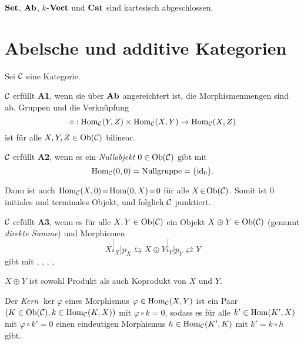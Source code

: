 \documentclass{cheat-sheet}
\begin{document}
\begin{bspe}
  $\mathbf{Set}$, $\mathbf{Ab}$, $k$-$\mathbf{Vect}$ und $\mathbf{Cat}$ sind kartesisch abgeschlossen.
\end{bspe}


\section{Abelsche und additive Kategorien}

Sei $\mathcal{C}$ eine Kategorie.

\begin{axiom}
  $\mathcal{C}$ erfüllt \textbf{A1}, wenn sie über $\mathbf{Ab}$ angereichtert ist, \dh{} die Morphismenmengen sind ab. Gruppen und die Verknüpfung
  \[ \circ : \operatorname{Hom}_{\mathcal{C}}(Y, Z) \times \operatorname{Hom}_{\mathcal{C}}(X, Y) \to \operatorname{Hom}_{\mathcal{C}}(X, Z) \]
  ist für alle $X, Y, Z \in \operatorname{Ob}(\mathcal{C})$ bilinear.
\end{axiom}

\begin{axiom}
  $\mathcal{C}$ erfüllt \textbf{A2}, wenn es ein \emph{Nullobjekt} $0 \in \operatorname{Ob}(\mathcal{C})$ gibt mit
  \[ \operatorname{Hom}_{\mathcal{C}}(0, 0) = \text{Nullgruppe} = \{ \operatorname{id}_0 \}. \]
\end{axiom}

\begin{bem}
  Dann ist auch $\operatorname{Hom}_{\mathcal{C}}(X, 0) \!=\! \operatorname{Hom}(0, X) \!=\! 0$ für alle $X \!\in\! \operatorname{Ob}(\mathcal{C})$.
  Somit ist $0$ initiales und terminales Objekt, und folglich $\mathcal{C}$ punktiert.
\end{bem}

\begin{axiom}
  $\mathcal{C}$ erfüllt \textbf{A3}, wenn es für alle $X, Y \in \operatorname{Ob}(\mathcal{C})$ ein Objekt $X \oplus Y \in \operatorname{Ob}(\mathcal{C})$ (genannt \emph{direkte Summe}) und Morphismen
  \[ X \stackrel[i_X]{p_X}{\leftrightarrows} X \oplus Y \stackrel[i_Y]{p_Y}{\rightleftarrows} Y \]
  gibt mit
  , \enspace
  , \enspace
  , \enspace
  , \enspace
\end{axiom}

\begin{bem}
  $X \oplus Y$ ist sowohl Produkt als auch Koprodukt von $X$ und $Y$.
\end{bem}


\begin{defn}
  Der \emph{Kern} $\ker \varphi$ eines Morphismus $\varphi \in \operatorname{Hom}_{\mathcal{C}}(X, Y)$ ist
  ein Paar $(K \in \operatorname{Ob}(\mathcal{C}), k \in \operatorname{Hom}_{\mathcal{C}}(K, X))$ mit
  $\varphi \circ k = 0$, sodass es für alle $k' \in \operatorname{Hom}(K', X)$ mit $\varphi \circ k' = 0$ einen eindeutigen Morphismus $h \in \operatorname{Hom}_{\mathcal{C}}(K', K)$ mit $k' = k \circ h$ gibt.
\end{defn}
\end{document}
